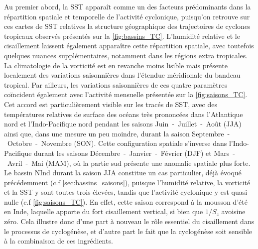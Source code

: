 \documentclass[../main.tex]{subfiles}
\begin{document}
Au premier abord, la SST apparaît comme un des facteurs prédominants dans la répartition spatiale et temporelle de l'activité cyclonique, puisqu'on retrouve sur
ces cartes de SST relatives la structure géographique des trajectoires de cyclones tropicaux observés présentés sur la \cref{fig:bassins_TC}. L'humidité
relative et le cisaillement laissent également apparaître cette répartition spatiale, avec toutefois quelques nuances supplémentaires, notamment dans les
régions extra tropicales. La climatologie de la vorticité est en revanche moins lisible mais présente localement des variations saisonnières dans l'étendue
méridionale du bandeau tropical. Par ailleurs, les variations saisonnières de ces quatre paramètres coïncident également avec l'activité mensuelle présentée sur
la \cref{fig:saisons_TC}. Cet accord est particulièrement visible sur les tracés de SST, avec des températures relatives de surface des océans très prononcées
dans l'Atlantique nord et l'Indo-Pacifique nord pendant les saisons Juin~-~Juillet~-~Août (JJA) ainsi que, dans une mesure un peu moindre, durant la saison
Septembre~-~Octobre~-~Novembre (SON). Cette configuration spatiale s'inverse dans l'Indo-Pacifique durant les saisons Décembre~-~Janvier~-~Février (DJF) et
Mars~-~Avril~-~Mai (MAM), où la partie sud présente une anomalie spatiale plus forte. Le bassin NInd durant la saison JJA constitue un cas particulier, déjà
évoqué précédemment (c.f \cref{sec:bassins_saisons}), puisque l'humidité relative, la vorticité et la SST y sont toutes trois élevées, tandis que l'activité
cyclonique y est quasi nulle (c.f \cref{fig:saisons_TC}). En effet, cette saison correspond à la mousson d'été en Inde, laquelle apporte du fort cisaillement
vertical, si bien que $1/S_z$ avoisine zéro. Cela illustre donc d'une part à nouveau le rôle essentiel du cisaillement dans le processus de cyclogénèse, et
d'autre part le fait que la cyclogénèse soit sensible à la combinaison de ces ingrédients.
\end{document}
